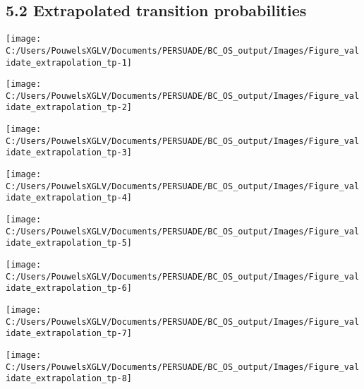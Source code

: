 \documentclass[
]{article}
\begin{document}
\clearpage

\subsection{5.2 Extrapolated transition
probabilities}\label{extrapolated-transition-probabilities}

\begin{flushleft}\texttt{[image: C:/Users/PouwelsXGLV/Documents/PERSUADE/BC\_OS\_output/Images/Figure\_validate\_extrapolation\_tp-1]} \end{flushleft}

\begin{flushleft}\texttt{[image: C:/Users/PouwelsXGLV/Documents/PERSUADE/BC\_OS\_output/Images/Figure\_validate\_extrapolation\_tp-2]} \end{flushleft}

\begin{flushleft}\texttt{[image: C:/Users/PouwelsXGLV/Documents/PERSUADE/BC\_OS\_output/Images/Figure\_validate\_extrapolation\_tp-3]} \end{flushleft}

\begin{flushleft}\texttt{[image: C:/Users/PouwelsXGLV/Documents/PERSUADE/BC\_OS\_output/Images/Figure\_validate\_extrapolation\_tp-4]} \end{flushleft}

\begin{flushleft}\texttt{[image: C:/Users/PouwelsXGLV/Documents/PERSUADE/BC\_OS\_output/Images/Figure\_validate\_extrapolation\_tp-5]} \end{flushleft}

\begin{flushleft}\texttt{[image: C:/Users/PouwelsXGLV/Documents/PERSUADE/BC\_OS\_output/Images/Figure\_validate\_extrapolation\_tp-6]} \end{flushleft}

\begin{flushleft}\texttt{[image: C:/Users/PouwelsXGLV/Documents/PERSUADE/BC\_OS\_output/Images/Figure\_validate\_extrapolation\_tp-7]} \end{flushleft}

\begin{flushleft}\texttt{[image: C:/Users/PouwelsXGLV/Documents/PERSUADE/BC\_OS\_output/Images/Figure\_validate\_extrapolation\_tp-8]} \end{flushleft}
\end{document}
